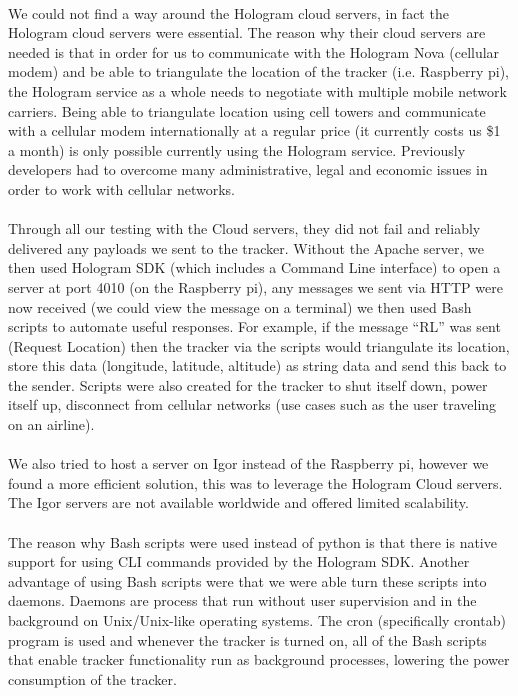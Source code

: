 \documentclass[12pt,a4paper]{article}
\begin{document}
        \paragraph{} We could not find a way around the Hologram cloud servers, in fact the Hologram cloud servers were essential. The reason why their cloud servers are needed is that in order for us to communicate with the Hologram Nova (cellular modem) and be able to triangulate the location of the tracker (i.e. Raspberry pi), the Hologram service as a whole needs to negotiate with multiple mobile network carriers. Being able to triangulate location using cell towers and communicate with a cellular modem internationally at a regular price (it currently costs us \$1 a month) is only possible currently using the Hologram service. Previously developers had to overcome many administrative, legal and economic issues in order to work with cellular networks.  
        
        \paragraph{} Through all our testing with the Cloud servers, they did not fail and reliably delivered any payloads we sent to the tracker. Without the Apache server, we then used Hologram SDK (which includes a Command Line interface) to open a server at port 4010 (on the Raspberry pi), any messages we sent via HTTP were now received (we could view the message on a terminal) we then used Bash scripts to automate useful responses. For example, if the message “RL” was sent (Request Location) then the tracker via the scripts would triangulate its location, store this data (longitude, latitude, altitude) as string data and send this back to the sender. Scripts were also created for the tracker to shut itself down, power itself up, disconnect from cellular networks (use cases such as the user traveling on an airline).
        
        \paragraph{} We also tried to host a server on Igor instead of the Raspberry pi, however we found a more efficient solution, this was to leverage the Hologram Cloud servers. The Igor servers are not available worldwide and offered limited scalability. 
        
        \paragraph{} The reason why Bash scripts were used instead of python is that there is native support for using CLI commands provided by the Hologram SDK. Another advantage of using Bash scripts were that we were able turn these scripts into daemons. Daemons are process that run without user supervision and in the background on Unix/Unix-like operating systems. The cron (specifically crontab) program is used and whenever the tracker is turned on, all of the Bash scripts that enable tracker functionality run as background processes, lowering the power consumption of the tracker.
        
\end{document}
